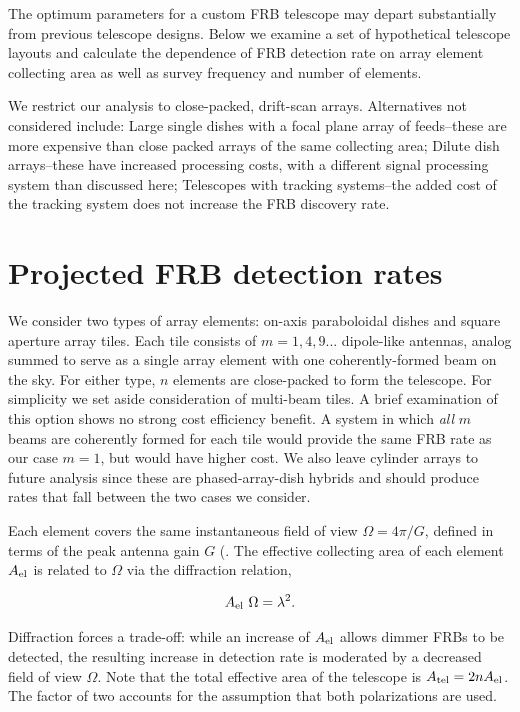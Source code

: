\documentclass[fleqn,usenatbib]{mnras}
\begin{document}
The optimum parameters for a custom FRB telescope may depart substantially from previous telescope designs.  Below we examine a set of hypothetical telescope layouts and calculate the dependence of FRB detection rate on array element collecting area as well as survey frequency and number of elements. 

We restrict our analysis to close-packed, drift-scan arrays. Alternatives not considered include: Large single dishes with a focal plane array of feeds--these are more expensive than close packed arrays of the same collecting area; Dilute dish arrays--these have increased processing costs, with a different signal processing system than discussed here; Telescopes with tracking systems--the added cost of the tracking system does not increase the FRB discovery rate.
 
\section{Projected FRB detection rates}

We consider two types of array elements: on-axis paraboloidal dishes and square aperture array tiles.  Each tile consists of $m=1, 4, 9 ...$ dipole-like antennas, analog summed to serve as a single array element with one coherently-formed beam on the sky. For either type, $n$ elements are close-packed to form the telescope.  For simplicity we set aside consideration of multi-beam tiles. A brief examination of this option shows no strong cost efficiency benefit.
A system in which {\it all} $m$ beams are coherently formed for each tile would provide the same FRB rate as our case $m=1$, but would have higher cost.
We also leave cylinder arrays \citep{chimesystem} to future analysis since these are phased-array-dish hybrids and should produce rates that fall between the two cases we consider.


Each element covers the same instantaneous field of view $\Omega=4\pi/G$, defined in terms of the peak antenna gain $G$ (\cite{era}. The effective collecting area of each element $A_{\rm{el}}$ is related to $\Omega$ via the diffraction relation, 

\begin{equation}
		A_{\rm{el}} ~\Omega =\lambda^2.
\end{equation}

Diffraction forces a trade-off: while an increase of $A_{\rm{el}}$ allows dimmer FRBs to be detected, the resulting increase in detection rate is moderated by a decreased field of view $\Omega$. Note that the total effective area of the telescope is $ A_{\rm{tel}}= 2 n A_{\rm{el}}$. The factor of two accounts for the assumption that both polarizations are used.
\end{document}

